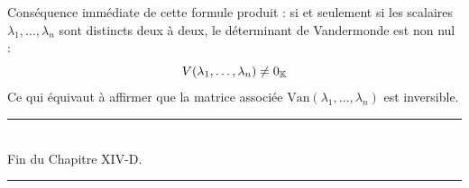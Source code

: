 \documentclass[12pt, a4paper]{report}
\begin{document}
\begin{remark}
    Conséquence immédiate de cette formule produit : si et seulement si les scalaires $\lambda_1, \dots, \lambda_n$ sont distincts deux à deux, le déterminant de Vandermonde est non nul :
    $$V(\lambda_1, \dots, \lambda_n) \neq 0_{\mathbb{K}}$$
    Ce qui équivaut à affirmer que la matrice associée $\text{Van}(\lambda_1, \dots, \lambda_n)$ est inversible.
\end{remark}

\begin{center}
    \rule{0.5\textwidth}{1pt}\\
    Fin du Chapitre XIV-D.\\
    \rule{0.5\textwidth}{1pt}
\end{center}

\printindex
\end{document}
